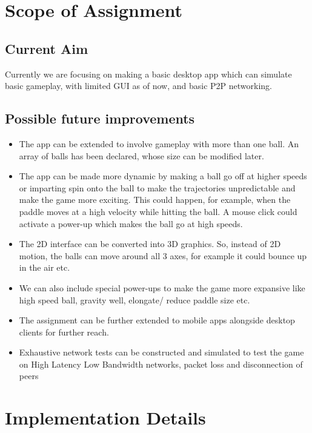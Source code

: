 \documentclass{article}
\begin{document}
\section{Scope of Assignment}
    \hfill\begin{minipage}{\dimexpr\textwidth-1cm}
    \subsection{Current Aim}
        Currently we are focusing on making a basic desktop app which can simulate basic gameplay, with limited GUI as of now, and basic P2P networking.
    \subsection{Possible future improvements}
        \begin{itemize}
        \item
        The app can be extended to involve gameplay with more than one ball. An array of balls has been declared, whose size can be modified later.
        \item
        The app can be made more dynamic by making a ball go off at higher speeds or imparting spin onto the ball to make the trajectories unpredictable and make the game more exciting. This could happen, for example, when the paddle moves at a high velocity while hitting the ball. A mouse click could activate a power-up which makes the ball go at high speeds.
        \item
        The 2D interface can be converted into 3D graphics. So, instead of 2D motion, the balls can move around all 3 axes, for example it could bounce up in the air etc.
        \item
        We can also include special power-ups to make the game more expansive like high speed ball, gravity well, elongate/ reduce paddle size etc.
        \item
        The assignment can be further extended to mobile apps alongside desktop clients for further reach.
        \item Exhaustive network tests can be constructed and simulated to test the game on High Latency Low Bandwidth networks, packet loss and disconnection of peers
        \end{itemize}
    \end{minipage}
    
\section{Implementation Details}
\end{document}
